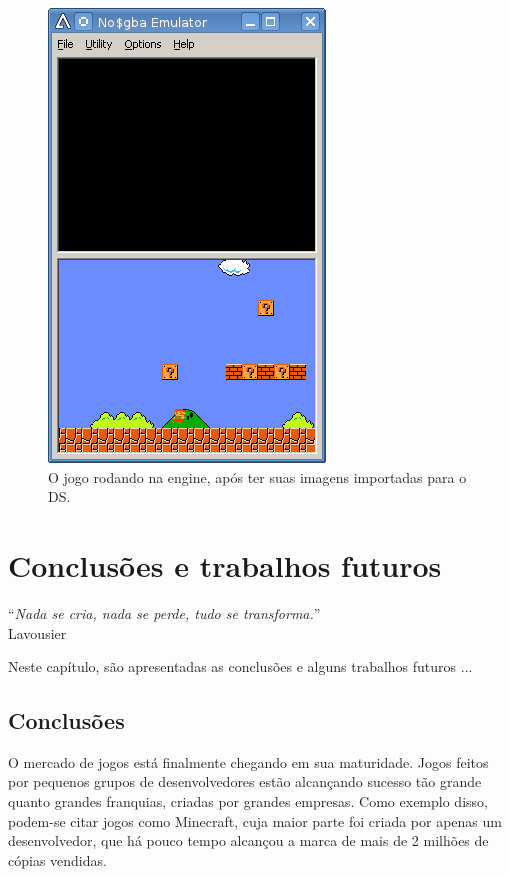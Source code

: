 \documentclass[brazil]{abnt}
\begin{document}
\begin{figure}[h!]
\centering
\includegraphics{imgs/nocash1.png}
\caption{O jogo rodando na engine, após ter suas imagens importadas para o DS.} 
\end{figure}


\chapter{Conclusões e trabalhos futuros\label{cap:conclusao}}

\vfill{}
\begin{flushright}{}``\emph{Nada se cria, nada se perde, tudo se
transforma.}''\\
{\small Lavousier}\end{flushright}{\small \par}
\vfill{}

Neste capítulo, são apresentadas as conclusões e alguns trabalhos futuros
...
\newpage


\section{Conclusões}

O mercado de jogos está finalmente chegando em sua maturidade. Jogos feitos por pequenos grupos de desenvolvedores estão alcançando sucesso tão grande quanto grandes franquias, criadas por grandes empresas. Como exemplo disso, podem-se citar jogos como Minecraft, cuja maior parte foi criada por apenas um desenvolvedor, que há pouco tempo alcançou a marca de mais de 2 milhões de cópias vendidas. \cite{MinecraftSales}
\end{document}
